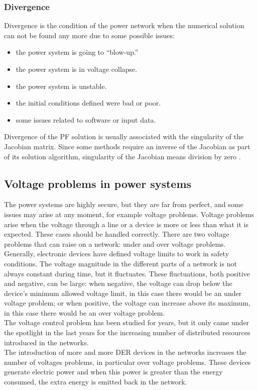\subsubsection{Divergence}
Divergence is the condition of the power network when the numerical solution can not be found any more due to some possible issues:

\begin{itemize}
    \item the power system is going to “blow-up.”
    \item the power system is in voltage collapse.
    \item the power system is unstable.
    \item the initial conditions defined were bad or poor.
    \item some issues related to software or input data.
\end{itemize}

Divergence of the \gls{PF} solution is usually associated with the singularity of the Jacobian matrix. Since some methods require an inverse of the Jacobian as part of its solution algorithm, singularity of the Jacobian means division by zero \cite{eps}.

\subsection{Voltage problems in power systems}
The power systems are highly secure, but they are far from perfect, and some issues may arise at any moment, for example voltage problems. Voltage problems arise when the voltage through a line or a device is more or less than what it is expected. These cases should be handled correctly. There are two voltage problems that can raise on a network: under and over voltage problems.\\
Generally, electronic devices have defined voltage limits to work in safety conditions. The voltage magnitude in the different parts of a network is not always constant during time, but it fluctuates. These fluctuations, both positive and negative, can be large: when negative, the voltage can drop below the device's minimum allowed voltage limit, in this case there would be an under voltage problem; or when positive, the voltage can increase above its maximum, in this case there would be an over voltage problem. \\

The voltage control problem has been studied for years, but it only came under the spotlight in the last years for the increasing number of distributed resources introduced in the networks. \\
The introduction of more and more \gls{DER} devices in the networks increases the number of voltages problems, in particular over voltage problems. These devices generate electric power and when this power is greater than the energy consumed, the extra energy is emitted back in the network.\\


